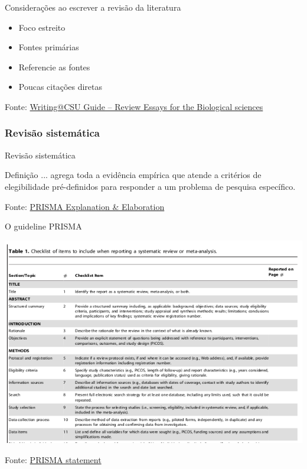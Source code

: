 \documentclass{beamer}
\begin{document}
\begin{frame}{Considerações ao escrever a revisão da literatura}
  \begin{itemize}
    \footnotesize
  \item Foco estreito
    \bigskip
  \item Fontes primárias
    \bigskip
  \item Referencie as fontes
    \bigskip
  \item Poucas citações diretas
  \end{itemize}

  \vfill
  \scriptsize
  \hfill Fonte: \href{https://writing.colostate.edu/guides/guide.cfm?guideid=79}
  {\tiny Writing@CSU Guide -- Review Essays for the Biological sciences}
\end{frame}

\subsubsection[Sistemática]{Revisão sistemática}

\begin{frame}{Revisão sistemática}
  \begin{block}{Definição}
    \footnotesize
    ... agrega toda a evidência empírica que atende a critérios de elegibilidade pré-definidos para responder a um problema de pesquisa específico.
  \end{block}

  \vfill
  \scriptsize
  \hfill Fonte: \href{https://doi.org/10.1371/journal.pmed.1000100}
  {\tiny PRISMA Explanation \& Elaboration}
\end{frame}

\begin{frame}{O guideline PRISMA}
  \begin{center}
    \includegraphics[height=.8\textheight]{Revisao_resumo/PRISMA-checklist}
  \end{center}
  \vfill
  \scriptsize
  \hfill Fonte: \href{https://doi.org/10.1371/journal.pmed.1000097}
  {\tiny PRISMA statement}
\end{frame}
\end{document}
